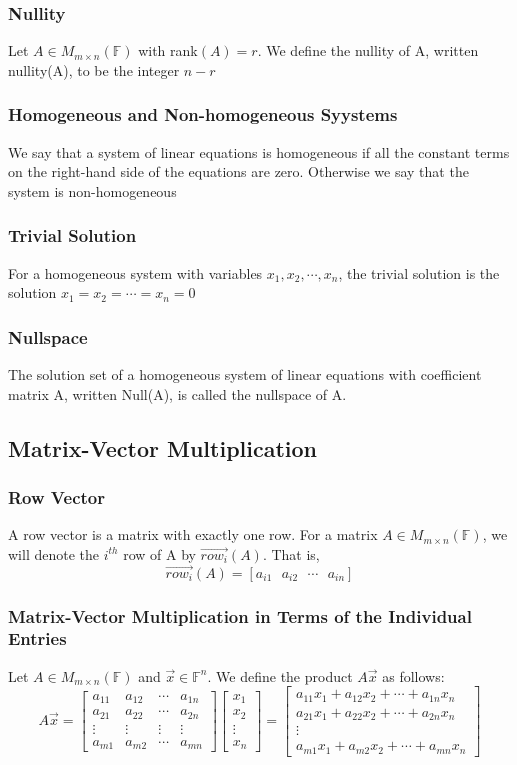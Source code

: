\documentclass[12pt, letterpaper]{article}
\begin{document}
\subsubsection{Nullity}
Let $A\in M_{m\times n}(\mathbb{F})$ with rank$(A)=r$. We define the nullity of A, written nullity(A), to be the integer $n-r$
\subsubsection{Homogeneous and Non-homogeneous Syystems}
We say that a system of linear equations is homogeneous if all the constant terms on the right-hand side of the equations are zero. 
Otherwise we say that the system is non-homogeneous
\subsubsection{Trivial Solution}
For a homogeneous system with variables $x_1, x_2, \cdots, x_n$, the trivial solution 
is the solution $x_1=x_2=\cdots=x_n=0$
\subsubsection{Nullspace}
The solution set of a homogeneous system of linear equations with coefficient matrix A, 
written Null(A), is called the nullspace of A.
\subsection{Matrix-Vector Multiplication}
\subsubsection{Row Vector}
A row vector is a matrix with exactly one row. For a matrix $A\in M_{m\times n}(\mathbb{F})$, we 
will denote the $i^{th}$ row of A by $\vec{row_i}(A)$. That is,
\[\vec{row_i}(A) = [a_{i1}\text{ }a_{i2}\text{ }\cdots\text{ }a_{in}]\]
\subsubsection{Matrix-Vector Multiplication in Terms of the Individual Entries}
Let $A\in M_{m\times n}(\mathbb{F})$ and $\vec{x}\in\mathbb{F}^n$. We define the product
$A\vec{x}$ as follows:
\[A\vec{x} = \begin{bmatrix}
    a_{11} &a_{12} &\cdots &a_{1n} \\
    a_{21} &a_{22} &\cdots &a_{2n} \\
    \vdots &\vdots &\vdots &\vdots \\
    a_{m1} &a_{m2} &\cdots &a_{mn}
\end{bmatrix} \begin{bmatrix}
    x_1 \\x_2 \\\vdots \\x_n
\end{bmatrix} = \begin{bmatrix}
    a_{11}x_1 + a_{12}x_2 + \cdots + a_{1n}x_n \\
    a_{21}x_1 + a_{22}x_2 + \cdots + a_{2n}x_n \\
    \vdots \\
    a_{m1}x_1 + a_{m2}x_2 + \cdots + a_{mn}x_n 
\end{bmatrix}\]
\end{document}
